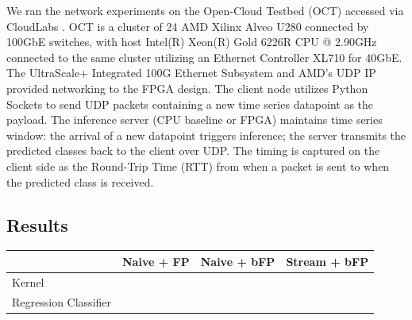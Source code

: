 We ran the network experiments on the Open-Cloud Testbed (OCT) \cite{oct, networkfpga} accessed via CloudLabs \cite{CloudLabs}. OCT is a cluster of 24 AMD Xilinx Alveo U280 connected by 100GbE switches, with host Intel(R) Xeon(R) Gold 6226R CPU @ 2.90GHz connected to the same cluster utilizing an Ethernet Controller XL710 for 40GbE. The UltraScale+ Integrated 100G Ethernet Subsystem and AMD's UDP IP \cite{xup_vitis_network_example} provided networking to the FPGA design. The client node utilizes Python Sockets to send UDP packets containing a new time series datapoint as the payload. The inference server (CPU baseline or FPGA) maintains time series window: the arrival of a new datapoint triggers  inference; the server transmits the predicted classes back to the client over UDP. The timing is captured on the client side as the Round-Trip Time (RTT) from when a packet is sent to when the predicted class is received. 

\subsection{Results}

\begin{table}[]
\begin{tabular}{|l|l|l|l|}
\hline
                      & Naive + FP & Naive + bFP & Stream + bFP \\ \hline
Kernel                &           &             &              \\ \hline
Regression Classifier &            &             &              \\ \hline
\end{tabular}
\end{table}




\label{sec:Results}